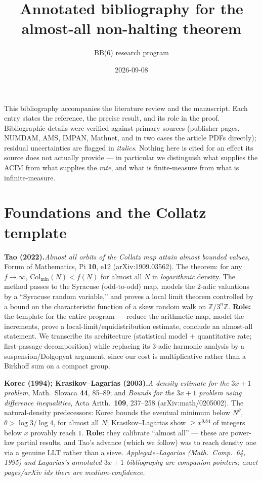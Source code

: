 \documentclass[11pt]{article}
\title{\bfseries Annotated bibliography for the almost-all non-halting theorem}
\author{BB(6) research program}
\date{2026-09-08}
\newcommand{\entry}[2]{\medskip\noindent\textbf{#1}\quad #2\par}
\begin{document}
\maketitle

\noindent This bibliography accompanies the literature review and the
manuscript. Each entry states the reference, the precise result, and its role
in the proof. Bibliographic details were verified against primary sources
(publisher pages, NUMDAM, AMS, IMPAN, Mathnet, and in two cases the article
PDFs directly); residual uncertainties are flagged in \emph{italics}. Nothing
here is cited for an effect its source does not actually provide --- in
particular we distinguish what supplies the ACIM from what supplies the
\emph{rate}, and what is finite-measure from what is infinite-measure.

\section{Foundations and the Collatz template}

\entry{Tao (2022).}{\emph{Almost all orbits of the Collatz map attain almost
bounded values}, Forum of Mathematics, Pi \textbf{10}, e12 (arXiv:1909.03562).
The theorem: for any $f\to\infty$, $\mathrm{Col}_{\min}(N)<f(N)$ for almost all
$N$ in \emph{logarithmic} density. The method passes to the Syracuse (odd-to-odd)
map, models the $2$-adic valuations by a ``Syracuse random variable,'' and
proves a local limit theorem controlled by a bound on the characteristic
function of a skew random walk on $\mathbb Z/3^n\mathbb Z$. \textbf{Role:} the
template for the entire program --- reduce the arithmetic map, model the
increments, prove a local-limit/equidistribution estimate, conclude an
almost-all statement. We transcribe its architecture (statistical model $+$
quantitative rate; first-passage decomposition) while replacing its $3$-adic
harmonic analysis by a suspension/Dolgopyat argument, since our cost is
multiplicative rather than a Birkhoff sum on a compact group.}

\entry{Korec (1994); Krasikov--Lagarias (2003).}{\emph{A density estimate for
the $3x+1$ problem}, Math.\ Slovaca \textbf{44}, 85--89; and \emph{Bounds for
the $3x+1$ problem using difference inequalities}, Acta Arith.\ \textbf{109},
237--258 (arXiv:math/0205002). The natural-density predecessors: Korec bounds
the eventual minimum below $N^{\theta}$, $\theta>\log3/\log4$, for almost all
$N$; Krasikov--Lagarias show $\ge x^{0.84}$ of integers below $x$ provably reach
$1$. \textbf{Role:} they calibrate ``almost all'' --- these are power-law
partial results, and Tao's advance (which we follow) was to reach density one
via a genuine LLT rather than a sieve. \emph{Applegate--Lagarias (Math.\ Comp.\
64, 1995) and Lagarias's annotated $3x{+}1$ bibliography are companion pointers;
exact pages/arXiv ids there are medium-confidence.}}
\end{document}
